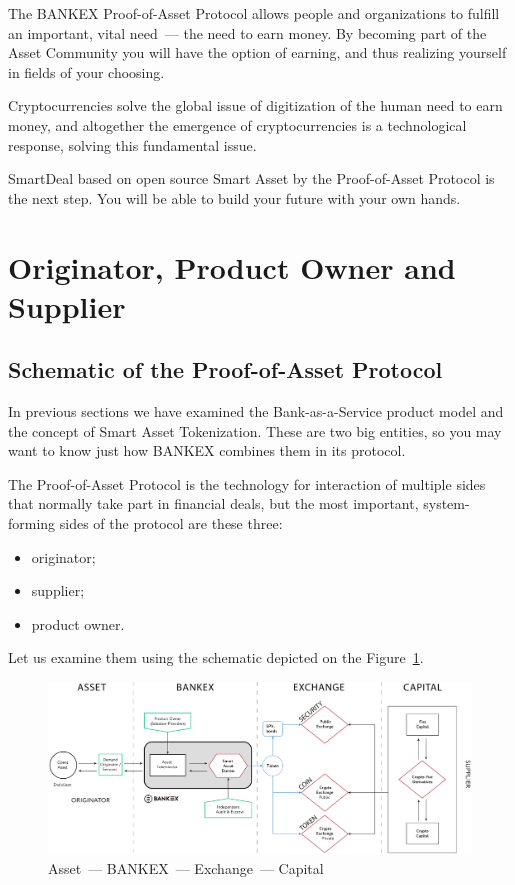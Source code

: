 \documentclass{article}
\begin{document}
\begin{multicols}{2}
The BANKEX Proof-of-Asset Protocol allows people and organizations to fulfill an important, vital need~--- the need to earn money. By becoming part of the Asset Community you will have the option of earning, and thus realizing yourself in fields of your choosing. 

Cryptocurrencies solve the global issue of digitization of the human need to earn money, and altogether the emergence of cryptocurrencies is a technological response, solving this fundamental issue. 

SmartDeal based on open source Smart Asset by the Proof-of-Asset Protocol is the next step. You will be able to build your future with your own hands.

\section{Originator, Product Owner and Supplier}

\subsection{Schematic of the Proof-of-Asset Protocol} \label{sec:proof-of-asset-schematic}

In previous sections we have examined the Bank-as-a-Service product model and the concept of Smart Asset Tokenization. These are two big entities, so you may want to know just how BANKEX combines them in its protocol.

The Proof-of-Asset Protocol is the technology for interaction of multiple sides that normally take part in financial deals, but the most important, system-forming sides of the protocol are these three:
	
\begin{itemize}
\item originator;
\item supplier;
\item product owner.
\end{itemize}

Let us examine them using the schematic depicted on the Figure~\ref{fig:asset-bankex-exchange-capital}.

\begin{figure}
  \centering
  \includegraphics[width=\textwidth]{asset-bankex-exchange-capital.png}
  \caption{Asset~--- BANKEX~--- Exchange~--- Capital}
  \label{fig:asset-bankex-exchange-capital}
\end{figure}


\end{multicols}
\end{document}
